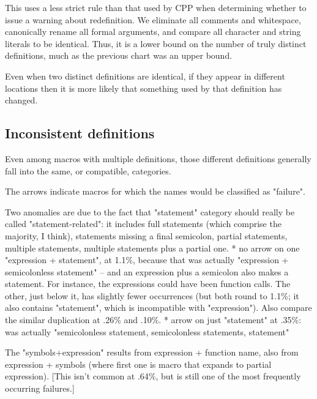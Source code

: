 \documentclass[10pt]{article}
\begin{document}
        This uses a less strict rule than that used by CPP when determining
          whether to issue a warning about redefinition.  We eliminate all
          comments and whitespace, canonically rename all formal arguments,
          and compare all character and string literals to be identical.
          Thus, it is a lower bound on the number of truly distinct
          definitions, much as the previous chart was an upper bound.

        Even when two distinct definitions are identical, if they appear in
          different locations then it is more likely that something used by
          that definition has changed.

\subsection{Inconsistent definitions}

        Even among macros with multiple definitions, those different
          definitions generally fall into the same, or compatible, categories.

        The arrows indicate macros for which the names would be classified
          as "failure".

        Two anomalies are due to the fact that "statement" category should
          really be called "statement-related":  it includes full
          statements (which comprise the majority, I think), statements
          missing a final semicolon, partial statements, multiple
          statements, multiple statements plus a partial one.
          * no arrow on one "expression + statement", at 1.1\%, because that
                was actually "expression + semicolonless statement" -- and
                an expression plus a semicolon also makes a statement.
                For instance, the expressions could have been function calls.
                The other, just below it, has slightly fewer occurrences
                (but both round to 1.1\%; it also contains "statement", which
                is incompatible with "expression").  Also compare the similar
                duplication at .26\% and .10\%.
          * arrow on just "statement" at .35\%:  was actually
                "semicolonless statement, semicolonless statements, statement"

        The "symbols+expression" results from expression + function name,
          also from expression + symbols (where first one is macro that expands
          to partial expression).  [This isn't common at .64\%, but is still
          one of the most frequently occurring failures.]
\end{document}
